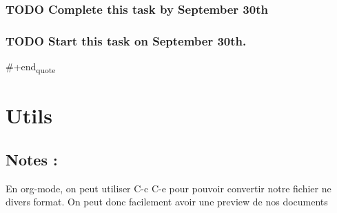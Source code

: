 \documentclass[11pt]{article}
\begin{document}
\subsubsection{{\bfseries\sffamily TODO} Complete this task by September 30th}
\label{sec:org0f6b3be}
\subsubsection{{\bfseries\sffamily TODO} Start this task on September 30th.}
\label{sec:org336d922}
\#+end\textsubscript{quote}
\section{Utils}
\label{sec:org5165c13}
\subsection{Notes :}
\label{sec:org6e6bfe3}
En org-mode, on peut utiliser C-c C-e pour pouvoir convertir notre fichier ne divers format.
On peut donc facilement avoir une preview de nos documents
\end{document}
